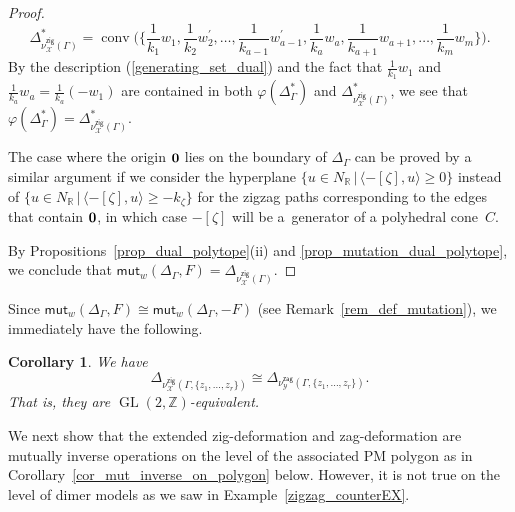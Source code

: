 \documentclass[pdftex]{sigma}%
\numberwithin{equation}{section}
\numberwithin{figure}{section}
\numberwithin{table}{section}
\newtheorem{Corollary}[Theorem]{Corollary}
\newcommand{\ZZ}{\mathbb{Z}}
\newcommand{\RR}{\mathbb{R}}
\newcommand{\calX}{\mathcal{X}}
\newcommand{\calY}{\mathcal{Y}}
\newcommand{\GL}{\operatorname{GL}}
\newcommand{\zig}{\mathsf{zig}}
\newcommand{\zag}{\mathsf{zag}}
\newcommand{\mutation}{\mathsf{mut}}
\begin{document}
\begin{proof}
\begin{displaymath}
\Delta_{\nu^\zig_\calX(\Gamma)}^*=\operatorname{conv}\bigg(\bigg\{\frac{1}{k_1}w_1,\frac{1}{k_2}w_2^\prime,\dots,\frac{1}{k_{a-1}}w_{a-1}^\prime,
\frac{1}{k_a}w_a, \frac{1}{k_{a+1}}w_{a+1}, \dots,\frac{1}{k_m}w_m\bigg\}\bigg).
\end{displaymath}
By the description (\ref{generating_set_dual}) and the fact that $\frac{1}{k_1}w_1$ and $\frac{1}{k_a}w_a=\frac{1}{k_a}(-w_1)$ are contained in both $\varphi(\Delta_\Gamma^*)$ and $\Delta_{\nu^\zig_\calX(\Gamma)}^*$, we see that $\varphi(\Delta_\Gamma^*)=\Delta_{\nu^\zig_\calX(\Gamma)}^*$.

The case where the origin ${\bf 0}$ lies on the boundary of $\Delta_\Gamma$ can be proved by a similar argument if we consider the hyperplane $\{u\in N_\RR\,|\,\langle-[\zeta],u\rangle\ge 0\}$ instead of $\{u\in N_\RR\,|\,\langle-[\zeta],u\rangle\ge -k_\zeta\}$ for the zigzag paths corresponding to the edges that contain ${\bf 0}$, in which case $-[\zeta]$ will be a~generator of a polyhedral cone~$C$.

By Propositions~\ref{prop_dual_polytope}(ii) and \ref{prop_mutation_dual_polytope}, we conclude that
$\mutation_{w}(\Delta_\Gamma,F)=\Delta_{\nu^\zig_\calX(\Gamma)}$.
\end{proof}

Since $\mutation_w(\Delta_\Gamma,F)\cong\mutation_w(\Delta_\Gamma,-F)$ (see Remark~\ref{rem_def_mutation}), we immediately have the following.

\begin{Corollary}
\label{cor_unimodular_deformedDM}
We have
\begin{displaymath}
\Delta_{\nu^\zig_\calX(\Gamma, \{z_1,\dots,z_r\})}\cong\Delta_{\nu^\zag_\calY(\Gamma, \{z_1,\dots,z_r\})}.
\end{displaymath}
That is, they are $\GL(2,\ZZ)$-equivalent.
\end{Corollary}

We next show that the extended zig-deformation and zag-deformation are mutually inverse operations on the level of the associated PM polygon
as in Corollary~\ref{cor_mut_inverse_on_polygon} below.
However, it is not true on the level of dimer models as we saw in Example~\ref{zigzag_counterEX}.
\end{document}
